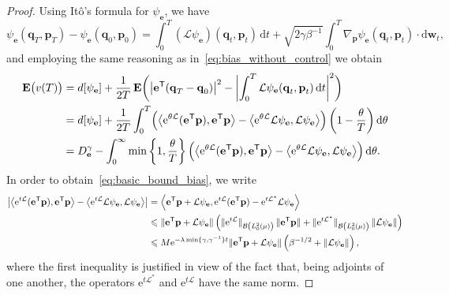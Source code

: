 \documentclass[11pt,a4paper]{article}
\newcommand{\e}{\mathrm{e}}
\newcommand{\expect}[0]{\mathbf{E}}
\newcommand{\grad}{\nabla}
\newcommand{\vect}[1]{\boldsymbol{\mathbf #1}}
\renewcommand{\d}{\mathrm d}
\renewcommand{\t}{\mathsf T}
\theoremstyle{plain}
\numberwithin{equation}{section}
\renewcommand{\leq}{\leqslant}
\begin{document}
\begin{proof}
Using Itô's formula for $\psi_{\vect e}$,
we have
\[
    \psi_{\vect e}(\vect q_T, \vect p_T) - \psi_{\vect e}(\vect q_0, \vect p_0)
    = \int_{0}^{T} (\mathcal L \psi_{\vect e}) (\vect q_t, \vect p_t) \, \d t
    + \sqrt{2 \gamma \beta^{-1}} \int_{0}^{T} \grad_{\vect p} \psi_{\vect e} (\vect q_t, \vect p_t) \cdot \d \vect w_t,
\]
and employing the same reasoning as in~\eqref{eq:bias_without_control} we obtain
\begin{align*}
    \expect \bigl(v(T)\bigr)
    &= d[\psi_{\vect e}] +  \frac{1}{2T} \, \expect \biggl( \bigl\lvert \vect e^\t (\vect q_T - \vect q_0) \bigr\rvert^2 - \biggl| \int_0^T {\mathcal L \psi_{\vect e}}(\vect q_t, \vect p_t) \, \d t \biggr|^2 \biggr) \\
    &= d[\psi_{\vect e}] +  \frac{1}{2T}  \int_{0}^{T} \Bigl( \ip{\e^{\theta \mathcal L}(\vect e^\t \vect p)}{\vect e^\t \vect p} - \ip{\e^{\theta \mathcal L} \mathcal L \psi_{\vect e}}{\mathcal L \psi_{\vect e}} \Bigr) \left( 1 - \frac{\theta}{T} \right) \d \theta \\
    &= D^{\gamma}_{\vect e} - \int_{0}^{\infty} \min\left\{1, \frac{\theta}{T}\right\} \Bigl( \ip{\e^{\theta \mathcal L}(\vect e^\t \vect p)}{\vect e^\t  \vect p} - \ip{\e^{\theta \mathcal L} \mathcal L \psi_{\vect e}}{\mathcal L \psi_{\vect e}} \Bigr) \, \d \theta.
\end{align*}
In order to obtain~\eqref{eq:basic_bound_bias}, we write
\begin{align*}
    \left\lvert \ip{\e^{t \mathcal L}(\vect e^\t \vect p)}{\vect e^\t \vect p} - \ip{\e^{t \mathcal L} \mathcal L \psi_{\vect e}}{\mathcal L \psi_{\vect e}} \right\rvert
    &= \ip{\vect e^\t \vect p + \mathcal L \psi_{\vect e}}{\e^{t \mathcal L} (\vect e^\t \vect p) - \e^{t \mathcal L^*} \mathcal  L\psi_{\vect e}} \\
    &\leq \norm*{\vect e^\t \vect p + \mathcal L \psi_{\vect e}}
    \left( \norm*{\e^{t \mathcal L}}[\mathcal B\left(L^2_0(\mu) \right)] \, \norm*{\vect e^\t \vect p} + \norm*{\e^{t \mathcal L^*}}[\mathcal B\left(L^2_0(\mu) \right)] \norm{\mathcal L \psi_{\vect e}} \right) \\
    &\leq M \e^{- \lambda \min\{\gamma, \gamma^{-1}\} t} \norm*{\vect e^\t \vect p + \mathcal L\psi_{\vect e}}  \left(\beta^{-1/2} + \norm{\mathcal L \psi_{\vect e}} \right),
\end{align*}
where the first inequality is justified in view of the fact that,
being adjoints of one another,
the operators $\e^{t \mathcal L^*}$ and $\e^{t \mathcal L}$ have the same norm.

\end{proof}
\end{document}
